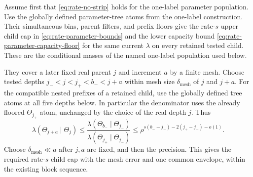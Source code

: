 Assume first that \eqref{eq:rate-no-strip} holds for the one-label
parameter population.  Use the globally defined parameter-tree atoms
from the one-label construction.
Their simultaneous bins, parent filters, and prefix floors give the
rate-$s$ upper child cap in \eqref{eq:rate-parameter-bounds} and the
lower capacity bound \eqref{eq:rate-parameter-capacity-floor} for the
same current $\lambda$ on every retained tested child.  These are the
conditional masses of the named one-label population used below.

They cover a later fixed real parent $j$ and increment $a$ by a finite
mesh.  Choose tested depths $j_-<j<j_+<b_-<j+a$ within mesh size
$\delta_{\mathrm{mesh}}$ of $j$ and $j+a$.  For the compatible nested
prefixes of a retained child, use the globally defined tree atoms at
all five depths below.  In particular the denominator uses
the already floored $\Theta_{j_+}$ atom, unchanged by the choice of the
real depth $j$.  Thus
\[
 \lambda(\Theta_{j+a}\mid\Theta_j)
 \le\frac{\lambda(\Theta_{b_-}\mid\Theta_{j_-})}
          {\lambda(\Theta_{j_+}\mid\Theta_{j_-})}
 \le\rho^{s(b_--j_-)-2(j_+-j_-)-o(1)}.
\]
Choose $\delta_{\mathrm{mesh}}\ll a$ after $j,a$ are fixed, and then
the precision.  This gives the required rate-$s$ child cap with the
mesh error and one common envelope, within the existing block sequence.

